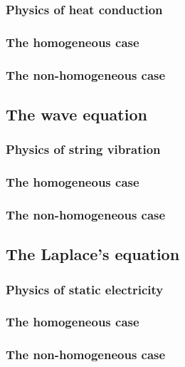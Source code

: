 \subsubsection{Physics of heat conduction}

\subsubsection{The homogeneous case}

\subsubsection{The non-homogeneous case}

\subsection{The wave equation}

\subsubsection{Physics of string vibration}

\subsubsection{The homogeneous case}

\subsubsection{The non-homogeneous case}


\subsection{The Laplace's equation}

\subsubsection{Physics of static electricity}

\subsubsection{The homogeneous case}

\subsubsection{The non-homogeneous case}